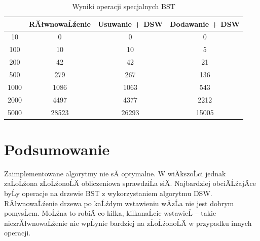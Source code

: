 \documentclass[a4paper, 11pt]{article}
\begin{document}
	\begin{table}[h!]
		\label{tab:bst}
		\caption{Wyniki operacji specjalnych BST}
		\begin{tabular}{c|c|c|c|}
			&	RĂłwnowaĹźenie	&	Usuwanie + DSW	&	Dodawanie + DSW		\\ \hline
			10	&	0	&	0	&	0		\\
			100	&	10	&	10	&	5		\\
			200	&	42	&	42	&	21		\\
			500	&	279	&	267	&	136		\\
			1000	&	1086	&	1063	&	543		\\
			2000	&	4497	&	4377	&	2212		\\
			5000	&	28523	&	26293	&	15005		\\
			
		\end{tabular}
	\end{table}
	
	\section{Podsumowanie}
	
	Zaimplementowane algorytmy nie sÄ optymalne. W wiÄkszoĹci jednak zaĹoĹźona zĹoĹźonoĹÄ obliczeniowa sprawdziĹa siÄ. Najbardziej obciÄĹźajÄce byĹy operacje na drzewie BST z wykorzystaniem algorytmu DSW. RĂłwnowaĹźenie drzewa po kaĹźdym wstawieniu wÄzĹa nie jest dobrym pomysĹem. MoĹźna to robiÄ co kilka, kilkanaĹcie wstawieĹ -- takie niezrĂłwnowaĹźenie nie wpĹynie bardziej na zĹoĹźonoĹÄ w przypadku innych operacji.
	
\end{document}
